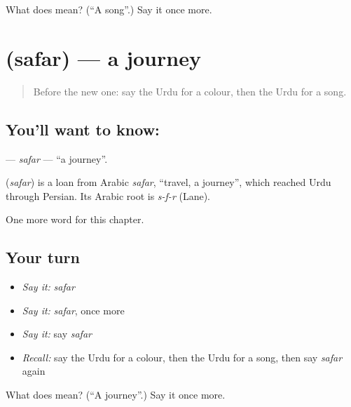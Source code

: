 \begin{tcolorbox}[breakable,colback=teal!4,colframe=teal!35!black,title={Before you move on}]
What does  mean? (\textquotedblleft{}A song\textquotedblright{}.) Say it once more.
\end{tcolorbox}
\section[\texorpdfstring{\ur{سفر} (safar)}{سفر (safar)}]{ (safar) — a journey}

\label{lesson:UR-C87-safar}



\begin{quote}
Before the new one: say the Urdu for a colour, then the Urdu for a song.
\end{quote}

\subsection*{You'll want to know: }
\textbf{} — \emph{safar} — \textquotedblleft{}a journey\textquotedblright{}.

\begin{cousinweb}
\textbf{} (\emph{safar}) is a loan from Arabic \emph{safar}, \textquotedblleft{}travel, a journey\textquotedblright{}, which reached Urdu through Persian. Its Arabic root is \emph{s-f-r} (Lane).
\end{cousinweb}

\begin{grammarlens}[title={What you've built}]
One more word for this chapter.
\end{grammarlens}

\subsection*{Your turn}
\begin{itemize}
\raggedright
  \item \emph{Say it:} \emph{safar}
  \item \emph{Say it:} \emph{safar}, once more
  \item \emph{Say it:} say \emph{safar}
  \item \emph{Recall:} say the Urdu for a colour, then the Urdu for a song, then say \emph{safar} again
\end{itemize}

\begin{tcolorbox}[breakable,colback=teal!4,colframe=teal!35!black,title={Before you move on}]
What does  mean? (\textquotedblleft{}A journey\textquotedblright{}.) Say it once more.
\end{tcolorbox}
